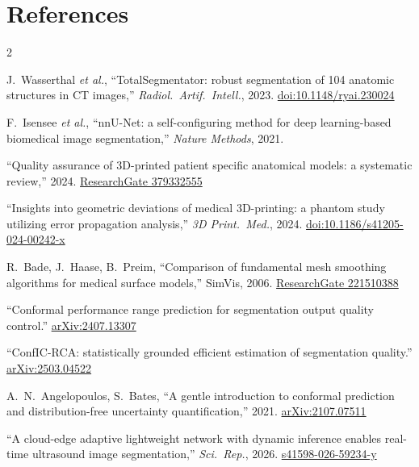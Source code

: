 \documentclass[10pt,a4paper]{article}
\begin{document}
\section*{References}
\vspace{-3pt}
\begin{multicols}{2}
\footnotesize
\begin{enumerate}[label={[\arabic*]},leftmargin=*,itemsep=0.5pt,topsep=0pt,parsep=0pt]
\item\label{r:tspaper} J.~Wasserthal \emph{et al.}, ``TotalSegmentator: robust segmentation of 104 anatomic structures in CT images,'' \emph{Radiol.\ Artif.\ Intell.}, 2023. \href{https://doi.org/10.1148/ryai.230024}{doi:10.1148/ryai.230024}
\item\label{r:nnunet} F.~Isensee \emph{et al.}, ``nnU-Net: a self-configuring method for deep learning-based biomedical image segmentation,'' \emph{Nature Methods}, 2021.
\item\label{r:qareview} ``Quality assurance of 3D-printed patient specific anatomical models: a systematic review,'' 2024. \href{https://www.researchgate.net/publication/379332555}{ResearchGate 379332555}
\item\label{r:phantom} ``Insights into geometric deviations of medical 3D-printing: a phantom study utilizing error propagation analysis,'' \emph{3D Print.\ Med.}, 2024. \href{https://doi.org/10.1186/s41205-024-00242-x}{doi:10.1186/s41205-024-00242-x}
\item\label{r:bade} R.~Bade, J.~Haase, B.~Preim, ``Comparison of fundamental mesh smoothing algorithms for medical surface models,'' SimVis, 2006. \href{https://www.researchgate.net/publication/221510388}{ResearchGate 221510388}
\item\label{r:conformal} ``Conformal performance range prediction for segmentation output quality control.'' \href{https://arxiv.org/abs/2407.13307}{arXiv:2407.13307}
\item\label{r:confic} ``ConfIC-RCA: statistically grounded efficient estimation of segmentation quality.'' \href{https://arxiv.org/abs/2503.04522}{arXiv:2503.04522}
\item\label{r:angelopoulos} A.~N.~Angelopoulos, S.~Bates, ``A gentle introduction to conformal prediction and distribution-free uncertainty quantification,'' 2021. \href{https://arxiv.org/abs/2107.07511}{arXiv:2107.07511}
\item\label{r:cloudedge} ``A cloud-edge adaptive lightweight network with dynamic inference enables real-time ultrasound image segmentation,'' \emph{Sci.\ Rep.}, 2026. \href{https://www.nature.com/articles/s41598-026-59234-y}{s41598-026-59234-y}

\end{enumerate}
\end{multicols}
\end{document}
